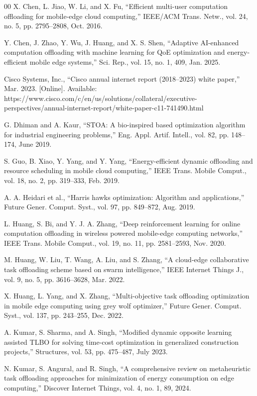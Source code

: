 \documentclass[conference]{IEEEtran}
\begin{document}
\begin{thebibliography}{00}
 X. Chen, L. Jiao, W. Li, and X. Fu, ``Efficient multi-user computation offloading for mobile-edge cloud computing,'' IEEE/ACM Trans. Netw., vol. 24, no. 5, pp. 2795--2808, Oct. 2016.

 Y. Chen, J. Zhao, Y. Wu, J. Huang, and X. S. Shen, ``Adaptive AI-enhanced computation offloading with machine learning for QoE optimization and energy-efficient mobile edge systems,'' Sci. Rep., vol. 15, no. 1, 409, Jan. 2025.

 Cisco Systems, Inc., ``Cisco annual internet report (2018--2023) white paper,'' Mar. 2023. [Online]. Available: https://www.cisco.com/c/en/us/solutions/collateral/executive-perspectives/annual-internet-report/white-paper-c11-741490.html

 G. Dhiman and A. Kaur, ``STOA: A bio-inspired based optimization algorithm for industrial engineering problems,'' Eng. Appl. Artif. Intell., vol. 82, pp. 148--174, June 2019.

 S. Guo, B. Xiao, Y. Yang, and Y. Yang, ``Energy-efficient dynamic offloading and resource scheduling in mobile cloud computing,'' IEEE Trans. Mobile Comput., vol. 18, no. 2, pp. 319--333, Feb. 2019.

 A. A. Heidari et al., ``Harris hawks optimization: Algorithm and applications,'' Future Gener. Comput. Syst., vol. 97, pp. 849--872, Aug. 2019.

 L. Huang, S. Bi, and Y. J. A. Zhang, ``Deep reinforcement learning for online computation offloading in wireless powered mobile-edge computing networks,'' IEEE Trans. Mobile Comput., vol. 19, no. 11, pp. 2581--2593, Nov. 2020.

 M. Huang, W. Liu, T. Wang, A. Liu, and S. Zhang, ``A cloud-edge collaborative task offloading scheme based on swarm intelligence,'' IEEE Internet Things J., vol. 9, no. 5, pp. 3616--3628, Mar. 2022.

 X. Huang, L. Yang, and X. Zhang, ``Multi-objective task offloading optimization in mobile edge computing using grey wolf optimizer,'' Future Gener. Comput. Syst., vol. 137, pp. 243--255, Dec. 2022.

 A. Kumar, S. Sharma, and A. Singh, ``Modified dynamic opposite learning assisted TLBO for solving time-cost optimization in generalized construction projects,'' Structures, vol. 53, pp. 475--487, July 2023.

 N. Kumar, S. Angural, and R. Singh, ``A comprehensive review on metaheuristic task offloading approaches for minimization of energy consumption on edge computing,'' Discover Internet Things, vol. 4, no. 1, 89, 2024.


\end{thebibliography}
\end{document}
